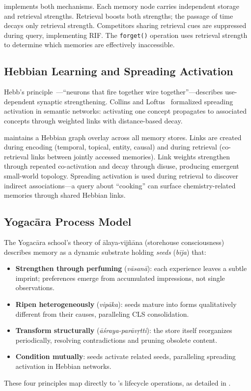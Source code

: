 \alaya{} implements both mechanisms. Each memory node carries independent
storage and retrieval strengths. Retrieval boosts both strengths; the passage
of time decays only retrieval strength. Competitors sharing retrieval cues
are suppressed during query, implementing RIF. The \texttt{forget()} operation
uses retrieval strength to determine which memories are effectively
inaccessible.

\subsection{Hebbian Learning and Spreading Activation}

Hebb's principle~\cite{hebb1949}---``neurons that fire together wire
together''---describes use-dependent synaptic strengthening. Collins and
Loftus~\cite{collins1975} formalized spreading activation in semantic
networks: activating one concept propagates to associated concepts through
weighted links with distance-based decay.

\alaya{} maintains a Hebbian graph overlay across all memory stores. Links
are created during encoding (temporal, topical, entity, causal) and during
retrieval (co-retrieval links between jointly accessed memories). Link
weights strengthen through repeated co-activation and decay through disuse,
producing emergent small-world topology. Spreading activation is used during
retrieval to discover indirect associations---a query about ``cooking'' can
surface chemistry-related memories through shared Hebbian links.

\subsection{Yogac\=ara Process Model}

The Yogac\=ara school's theory of \=alaya-vij\~n\=ana (storehouse
consciousness) describes memory as a dynamic substrate holding \emph{seeds}
(\emph{b\=ija}) that:
\begin{itemize}[nosep]
    \item \textbf{Strengthen through perfuming} (\emph{v\=asan\=a}): each
    experience leaves a subtle imprint; preferences emerge from accumulated
    impressions, not single observations.
    \item \textbf{Ripen heterogeneously} (\emph{vip\=aka}): seeds mature
    into forms qualitatively different from their causes, paralleling CLS
    consolidation.
    \item \textbf{Transform structurally}
    (\emph{\=a\'sraya-par\=av\d{r}tti}): the store itself reorganizes
    periodically, resolving contradictions and pruning obsolete content.
    \item \textbf{Condition mutually}: seeds activate related seeds,
    paralleling spreading activation in Hebbian networks.
\end{itemize}

\noindent These four principles map directly to \alaya{}'s lifecycle
operations, as detailed in .
